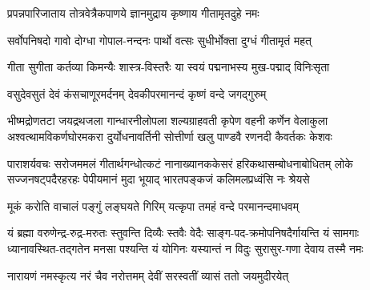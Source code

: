 \twolineshloka
{प्रपन्नपारिजाताय तोत्रवेत्रैकपाणये}
{ज्ञानमुद्राय कृष्णाय गीतामृतदुहे नमः}%

\twolineshloka
{सर्वोपनिषदो गावो दोग्धा गोपाल-नन्दनः}
{पार्थो वत्सः सुधीर्भोक्ता दुग्धं गीतामृतं महत्}%

\twolineshloka
{गीता सुगीता कर्तव्या किमन्यैः शास्त्र-विस्तरैः}
{या स्वयं पद्मनाभस्य मुख-पद्माद् विनिःसृता}%

\twolineshloka
{वसुदेवसुतं देवं कंसचाणूरमर्दनम्}
{देवकीपरमानन्दं कृष्णं वन्दे जगद्गुरुम्}%

\fourlineindentedshloka
{भीष्मद्रोणतटा जयद्रथजला गान्धारनीलोपला}
{शल्यग्राहवती कृपेण वहनी कर्णेन वेलाकुला}
{अश्वत्थामविकर्णघोरमकरा दुर्योधनावर्तिनी}
{सोत्तीर्णा खलु पाण्डवै रणनदी कैवर्तकः केशवः}%

\fourlineindentedshloka
{पाराशर्यवचः सरोजममलं गीतार्थगन्धोत्कटं}
{नानाख्यानककेसरं हरिकथासम्बोधनाबोधितम्}
{लोके सज्जनषट्पदैरहरहः पेपीयमानं मुदा}
{भूयाद् भारतपङ्कजं कलिमलप्रध्वंसि नः श्रेयसे}%

\twolineshloka
{मूकं करोति वाचालं पङ्गुं लङ्घयते गिरिम्}
{यत्कृपा तमहं वन्दे परमानन्दमाधवम्}%

\fourlineindentedshloka
{यं ब्रह्मा वरुणेन्द्र-रुद्र-मरुतः स्तुवन्ति दिव्यैः स्तवैः}
{वेदैः साङ्ग-पद-क्रमोपनिषदैर्गायन्ति यं सामगाः}
{ध्यानावस्थित-तद्गतेन मनसा पश्यन्ति यं योगिनः}
{यस्यान्तं न विदुः सुरासुर-गणा देवाय तस्मै नमः}%

\twolineshloka
{नारायणं नमस्कृत्य नरं चैव नरोत्तमम्}
{देवीं सरस्वतीं व्यासं ततो जयमुदीरयेत्}%

\resetShloka